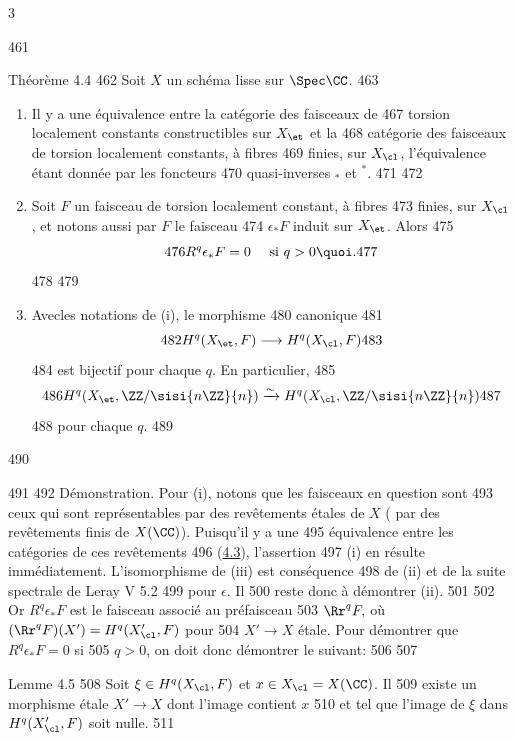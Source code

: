 3	\documentclass[10pt]{../fichiers-configuration-latex/smfart}
\begin{document}
   461	\begin{enonce*}{Théorème 4.4}
   462	Soit $X$ un schéma lisse sur $\Spec \CC$.
   463	\begin{enumerate}
   464	\renewcommand{\theenumi}{\roman{enumi}}
   465	\renewcommand{\labelenumi}{(\theenumi)}
   466	\item Il y a une équivalence entre la catégorie des faisceaux de
   467	  torsion localement constants constructibles sur $X_{\et}$ et la
   468	  catégorie des faisceaux de torsion localement constants, à fibres
   469	  finies, sur $X_{\cl}$, l'équivalence étant donnée par les foncteurs
   470	  quasi-inverses ${}_{\ast}$ et ${}^{\ast}$.
   471	
   472	\item Soit $F$ un faisceau de torsion localement constant, à fibres
   473	  finies, sur $X_{\cl}$, et notons aussi par $F$ le faisceau
   474	  $\epsilon_{\ast}F$ induit sur $X_{\et}$. Alors
   475	$$
   476	R^q\epsilon_{\ast}F=0\quad \mbox{ si } q>0{\quoi}.
   477	$$
   478	
   479	\item Avec\pageoriginale les notations de {\rm(i)}, le morphisme
   480	  canonique
   481	$$
   482	H^q(X_{\et},F)\longrightarrow H^q(X_{\cl},F)
   483	$$
   484	est bijectif pour chaque $q$. En particulier,
   485	$$
   486	H^q(X_{\et}, \ZZ/\sisi{n\ZZ}{n})\xrightarrow{\sim} H^q(X_{\cl},\ZZ/\sisi{n\ZZ}{n})
   487	$$
   488	pour chaque $q$.
   489	\end{enumerate}
   490	\end{enonce*}
   491	
   492	Démonstration. Pour (i), notons que les faisceaux en question sont
   493	ceux qui sont représentables par des revêtements étales de $X$ (	par des revêtements finis de $X(\CC)$). Puisqu'il y a une
   495	équivalence entre les catégories de ces revêtements
   496	(\hyperref[XI.thm4.3]{4.3}), l'assertion 
   497	(i) en résulte immédiatement. L'isomorphisme de (iii) est conséquence
   498	de (ii) et de la suite spectrale de Leray V 5.2 %
   499	pour $\epsilon$. Il
   500	reste donc à démontrer (ii).
   501	
   502	Or $R^q\epsilon_{\ast}F$ est le faisceau associé au préfaisceau
   503	$\Rr^qF,$ où $(\Rr^qF)(X')=H^q(X'_{\cl},F)$ pour
   504	$X'\rightarrow X$ étale. Pour démontrer que $R^q\epsilon_{\ast}F=0$ si
   505	$q>0$, on doit donc démontrer le  suivant:
   506	
   507	\begin{enonce*}{Lemme 4.5}
   508	Soit $\xi\in H^q(X_{\cl},F)$ et $x\in X_{\cl}=X(\CC)$. Il
   509	existe un morphisme étale $X'\rightarrow X$ dont l'image contient $x$
   510	et tel que l'image de $\xi$ dans $H^q(X'_{\cl},F)$ soit nulle.
   511	\end{enonce*}
\end{document}
